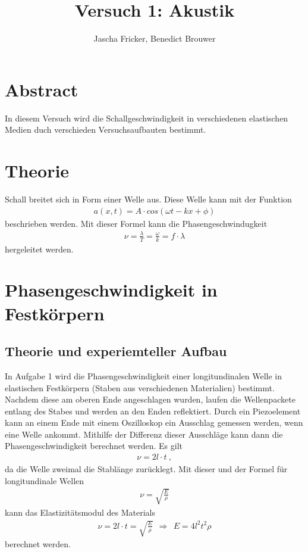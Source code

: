 \documentclass[11pt, a4paper]{article}
\title{Versuch 1: Akustik}
\author{Jascha Fricker, Benedict Brouwer}
\begin{document}
    \maketitle

    \section{Abstract}
    In diesem Versuch wird die Schallgeschwindigkeit in verschiedenen elastischen Medien
    duch verschieden Versuchsaufbauten bestimmt.

    \tableofcontents

    \newpage
    
    \section{Theorie}
    Schall breitet sich in Form einer Welle aus. Diese Welle kann mit der Funktion
    \begin{align}
        a(x, t) = A \cdot cos(\omega t-kx+\phi )
    \end{align}
    beschrieben werden. Mit dieser Formel kann die Phasengeschwindugkeit
    \begin{align}
        \nu = \frac{\lambda}{T} = \frac{\omega}{k} = f \cdot \lambda
    \end{align}
    hergeleitet werden. \\
    \section{Phasengeschwindigkeit in Festkörpern}

    \subsection{Theorie und experiemteller Aufbau}
    In Aufgabe 1 wird die Phasengeschwindigkeit einer longitundinalen Welle in elastischen Festkörpern (Staben aus verschiedenen Materialien) bestimmt.
    Nachdem diese am oberen Ende angeschlagen wurden, laufen die Wellenpackete entlang des Stabes und werden an den Enden reflektiert.
    Durch ein Piezoelement kann an einem Ende mit einem Oszilloskop ein Ausschlag gemessen werden, wenn eine Welle ankommt.
    Mithilfe der Differenz dieser Ausschläge kann dann die Phasengeschwindigkeit berechnet werden. Es gilt
    \begin{align}
        \nu = 2l \cdot t \ ,
    \end{align}
    da die Welle zweimal die Stablänge zurücklegt. Mit dieser und der Formel für longitundinale Wellen
    \begin{align}
        \nu = \sqrt{\frac{E}{\rho}}
    \end{align}
    kann das Elastizitätsmodul des Materials
    \begin{align}
        \nu = 2l \cdot t = \sqrt{\frac{E}{\rho}} \ \ \Rightarrow \ \ E = 4l^2 t^2 \rho
    \end{align}
    berechnet werden.
\end{document}
